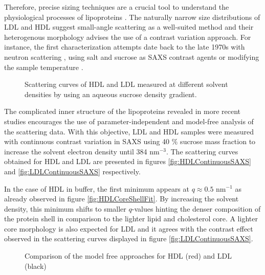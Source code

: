 Therefore, precise sizing techniques are a crucial tool to understand the physiological processes of lipoproteins \cite{german_lipoproteins:_2006}. The naturally narrow size distributions of LDL and HDL suggest small-angle scattering as a well-suited method and their heterogenous morphology advises the use of a contrast variation approach. For instance, the first characterization attempts date back to the late 1970s with neutron scattering \cite{stuhrmann_neutron_1975}, using salt \cite{tardieu_structure_1976} and sucrose \cite{muller_structure_1978} as SAXS contrast agents or modifying the sample temperature \cite{laggner_molecular_1977,luzzati_structure_1979}. 

\begin{figure}
	\centering
		\subfloat[HDL]{\resizebox{0.44\linewidth}{!}{}\label{fig:HDLContinuousSAXS}}
		\subfloat[LDL]{\resizebox{0.44\linewidth}{!}{}\label{fig:LDLContinuousSAXS}}
		\caption{Scattering curves of HDL and LDL measured at different solvent densities by using an aqueous sucrose density gradient.}
\end{figure}

The complicated inner structure of the lipoproteins revealed in more recent studies \cite{baumstark_structure_1990,schnitzer_re-evaluation_1994} encourages the use of parameter-independent and model-free analysis of the scattering data. With this objective, LDL and HDL samples were measured with continuous contrast variation in SAXS using 40 $\%$ sucrose mass fraction to increase the solvent electron density until 384 nm$^{-3}$. The scattering curves obtained for HDL and LDL are presented in figures \ref{fig:HDLContinuousSAXS} and \ref{fig:LDLContinuousSAXS} respectively.

In the case of HDL in buffer, the first minimum appears at $q\approx0.5$ nm$^{-1}$ as already observed in figure \ref{fig:HDLCoreShellFit}. By increasing the solvent density, this minimum shifts to smaller $q$-values hinting the denser composition of the protein shell in comparison to the lighter lipid and cholesterol core. A lighter core morphology is also expected for LDL \cite{luzzati_structure_1979} and it agrees with the contrast effect observed in the scattering curves displayed in figure \ref{fig:LDLContinuousSAXS}.

\begin{figure}
	\centering
		\caption{Comparison of the model free approaches for HDL (red) and LDL (black)}
\end{figure}

